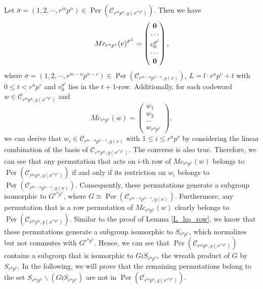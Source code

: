 \documentclass[journal,12pt,onecolumn]{IEEEtran}
\begin{document}
 Let $\bar{\sigma} = (1,2,\cdots,r^mp^n)\in \operatorname{Per}(\mathcal{C}_{r^mp^n,g(x^{r^up^v})})$. Then we have
    \[
        Mc_{r^up^v}(v)^{\bar{\sigma}^L} = \begin{pmatrix}
            {\bf 0} \\
            \cdots \\
            v_0^{\sigma^l} \\
            \cdots \\
            {\bf 0}
        \end{pmatrix},
    \]
    where $\sigma = (1,2,\cdots,r^{m-u}p^{n-v})\in\operatorname{Per}(\mathcal{C}_{r^{m-u}p^{n-v},g(x)})$, $L = l\cdot r^up^v + t$ with $0\le t< r^up^v$ and $v_0^{\sigma^l}$ lies in the $t+1$-row. Additionally, for each codeword $w\in\mathcal{C}_{r^mp^n,g(x^{r^up^v})}$ and
    \[
        Mc_{r^up^v}(w) = \begin{pmatrix}
            w_1 \\
            w_2 \\
            \cdots \\
            w_{r^up^v}
        \end{pmatrix},
    \]
    we can derive that $w_i\in\mathcal{C}_{r^{m-u}p^{n-v},g(x)}$ with $1\le i\le r^up^v$ by considering the linear combination of the basis of $\mathcal{C}_{r^mp^n,g(x^{r^up^v})}$. The converse is also true. Therefore, we can see that any permutation that acts on $i$-th row of $Mc_{r^up^v}(w)$ belongs to $\operatorname{Per}(\mathcal{C}_{r^mp^n,g(x^{r^up^v})})$ if and only if its restriction on $w_i$ belongs to $\operatorname{Per}(\mathcal{C}_{r^{m-u}p^{n-v},g(x)})$. Consequently, these permutations generate a subgroup isomorphic to $G^{r^up^v}$, where $G\cong \operatorname{Per}(\mathcal{C}_{r^{m-u}p^{n-v},g(x)})$. Furthermore, any permutation that is a row permutation of $Mc_{r^up^v}(w)$ clearly belongs to $\operatorname{Per}(\mathcal{C}_{r^mp^n,g(x^{r^up^v})})$. Similar to the proof of Lemma \ref{L_hp_row}, we know that these permutations generate a subgroup isomorphic to $S_{r^up^v}$, which normalizes but not commutes with $G^{r^up^v}$. Hence, we can see that $\operatorname{Per}(\mathcal{C}_{r^mp^n,g(x^{r^up^v})})$ contains a subgroup that is isomorphic to $G \wr S_{r^up^v}$, the wreath product of \(G\) by \(S_{r^up^v}\). In the following, we will prove that the remaining permutations belong to the set $S_{r^mp^n}\backslash(G \wr S_{r^up^v})$ are not in $\operatorname{Per}(\mathcal{C}_{r^mp^n,g(x^{r^up^v})})$. 
\end{document}

